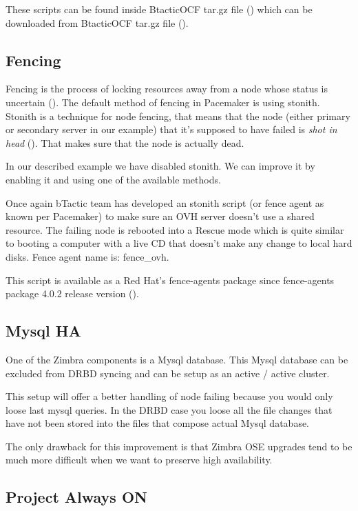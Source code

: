 These scripts can be found inside BtacticOCF tar.gz file (\cite{BtacticOCF}) which can be downloaded from BtacticOCF  tar.gz file (\cite{BtacticOrg}).

\subsection {\label{subsec:fencing}Fencing}
Fencing is the process of locking resources away from a node whose status is uncertain (\cite{LinuxHAFencing}). The default method of fencing in Pacemaker is using stonith. Stonith is a technique for node fencing, that means that the node (either primary or secondary server in our example) that it's supposed to have failed is \textit{shot in head} (\cite{LinuxHAStonith}). That makes sure that the node is actually dead.

In our described example we have disabled stonith. We can improve it by enabling it and using one of the available methods.

Once again bTactic team has developed an stonith script (or fence agent as known per Pacemaker) to make sure an OVH server doesn't use a shared resource. The failing node is rebooted into a Rescue mode which is quite similar to booting a computer with a live CD that doesn't make any change to local hard disks. Fence agent name is: fence\_ovh.

This script is available as a Red Hat's fence-agents package since fence-agents package 4.0.2 release version (\cite{LinuxClusterML201307}).

\subsection {\label{subsection:mysql-ha}Mysql HA}
One of the Zimbra components is a Mysql database. This Mysql database can be excluded from DRBD syncing and can be setup as an active / active cluster.

This setup will offer a better handling of node failing because you would only loose last mysql queries. In the DRBD case you loose all the file changes that have not been stored into the files that compose actual Mysql database.

The only drawback for this improvement is that Zimbra OSE upgrades tend to be much more difficult when we want to preserve high availability.

\subsection {Project Always ON}

